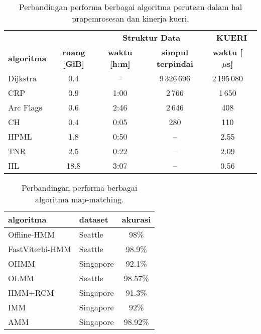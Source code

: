 \documentclass[ugmskripsi]{ugmskripsi}
\begin{document}
\begin{table}[h]
\setlength{\tabcolsep}{6pt}
\caption{Perbandingan performa berbagai algoritma perutean dalam hal prapemrosesan dan kinerja kueri.}
\label{tab2:route_planning_algorithm_performance}
\begin{tabular}{l c c c c c}
\hline
 &  & \multicolumn{2}{c}{\textbf{Struktur Data}} & \multicolumn{2}{c}{\textbf{KUERI}} \\
\cline{3-5}
\textbf{algoritma} & \textbf{ruang [GiB]} & \textbf{waktu [h:m]} & \textbf{simpul terpindai} & \textbf{waktu [\(\mu\)s]} \\
\hline
Dijkstra      & 0.4   & --     & 9\,326\,696 & 2\,195\,080 \\
CRP           & 0.9   & 1:00   & 2\,766      & 1\,650 \\
Arc Flags     & 0.6   & 2:46   & 2\,646      & 408 \\
CH            & 0.4   & 0:05   & 280        & 110 \\
HPML          & 1.8   & 0:50   & --         & 2.55 \\
TNR           & 2.5   & 0:22   & --         & 2.09 \\
HL            & 18.8  & 3:07   & --         & 0.56 \\
\hline
\end{tabular}
\end{table}


\begin{table}[h]
\setlength{\tabcolsep}{6pt}
\caption{Perbandingan performa berbagai algoritma map-matching.}
\label{tab2:map_matching_performance}
\begin{tabular}{l l c }
\hline
\textbf{algoritma} & \textbf{dataset} & \textbf{akurasi} \\
\hline
Offline-HMM  & Seattle & 98\%   \\
FastViterbi-HMM & Seattle & 98.9\% \\
OHMM & Singapore & 92.1\% \\
OLMM & Seattle & 98.57\% \\
HMM+RCM & Singapore & 91.3\% \\
IMM & Singapore & 92\% \\
AMM & Singapore & 98.92\% \\
\hline
\end{tabular}
\end{table}
\end{document}
